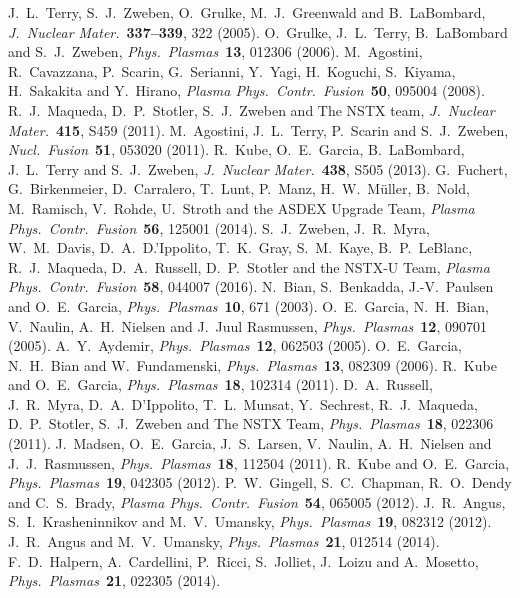 \documentclass[aps,prb,12pt,a4paper,preprint,amsmath,amssymb,groupedaddress]{revtex4-1}
\newcommand{\JNM}{\textit{J.~Nuclear Mater.}}
\newcommand{\NF}{\textit{Nucl.\ Fusion}}
\newcommand{\PPCF}{\textit{Plasma Phys.\ Contr.\ Fusion}}
\newcommand{\PP}{\textit{Phys.\ Plasmas}}
\begin{document}
\begin{thebibliography}{99}
%
%
J.~L.~Terry, S.~J.~Zweben, O.~Grulke, M.~J.~Greenwald and B.~La{B}ombard, \JNM\ {\bf 337--339}, 322 (2005).
%
O.~Grulke, J.~L.~Terry, B.~La{B}ombard and S.~J.~Zweben, \PP\ {\bf 13}, 012306 (2006).
%
M.~Agostini, R.~Cavazzana, P.~Scarin, G.~Serianni, Y.~Yagi, H.~Koguchi, S.~Kiyama, H.~Sakakita and Y.~Hirano, \PPCF\ {\bf 50}, 095004 (2008).
%
R.~J.~Maqueda, D.~P.~Stotler, S.~J.~Zweben and The NSTX team, \JNM\ {\bf 415}, S459 (2011).
%
M.~Agostini, J.~L.~Terry, P.~Scarin and S.~J.~Zweben, \NF\ {\bf 51}, 053020 (2011).
%
R.~Kube, O.~E.~Garcia, B.~La{B}ombard, J.~L.~Terry and S.~J.~Zweben, \JNM\ {\bf 438}, S505 (2013).
%
G.~Fuchert, G.~Birkenmeier, D.~Carralero, T.~Lunt, P.~Manz, H.~W.~M{\"u}ller, B.~Nold, M.~Ramisch, V.~Rohde, U.~Stroth and the ASDEX Upgrade Team, \PPCF\ {\bf 56}, 125001 (2014).
%
S.~J.~Zweben, J.~R.~Myra, W.~M.~Davis, D.~A.~D.'{I}ppolito, T.~K.~Gray,
S.~M.~Kaye, B.~P.~Le{B}lanc, R.~J.~Maqueda, D.~A.~Russell, D.~P.~Stotler and the NSTX-U Team, \PPCF\ {\bf 58}, 044007 (2016).
%
%
N.~Bian, S.~Benkadda, J.-V.~Paulsen and O.~E.~Garcia, \PP\ {\bf 10}, 671 (2003).
%
O.~E.~Garcia, N.~H.~Bian, V.~Naulin, A.~H.~Nielsen and J.~Juul Rasmussen, \PP\ {\bf 12}, 090701 (2005).
%
A.~Y.~Aydemir, \PP\ {\bf 12}, 062503 (2005).
%
O.~E.~Garcia, N.~H.~Bian and W.~Fundamenski, \PP\ {\bf 13}, 082309 (2006).
%
R.~Kube and O.~E.~Garcia, \PP\ {\bf 18}, 102314 (2011).
%
D.~A.~Russell, J.~R.~Myra, D.~A.~D'{I}ppolito, T.~L.~Munsat, Y.~Sechrest, R.~J.~Maqueda, D.~P.~Stotler, S.~J.~Zweben and The NSTX Team, \PP\ {\bf 18}, 022306 (2011).
%
J.~Madsen, O.~E.~Garcia, J.~S.~Larsen, V.~Naulin, A.~H.~Nielsen and J.~J.~Rasmussen, \PP\ {\bf 18}, 112504 (2011).
%
R.~Kube and O.~E.~Garcia, \PP\ {\bf 19}, 042305 (2012).
%
P.~W.~Gingell, S.~C.~Chapman, R.~O.~Dendy and C.~S.~Brady, \PPCF\ {\bf 54}, 065005 (2012).
%
J.~R.~Angus, S.~I.~Krasheninnikov and M.~V.~Umansky, \PP\ {\bf 19}, 082312 (2012).
%
J.~R.~Angus and M.~V.~Umansky, \PP\ {\bf 21}, 012514 (2014).
%
F.~D.~Halpern, A.~Cardellini, P.~Ricci, S.~Jolliet, J.~Loizu and A.~Mosetto, \PP\ {\bf 21}, 022305 (2014).
%

\end{thebibliography}
\end{document}
